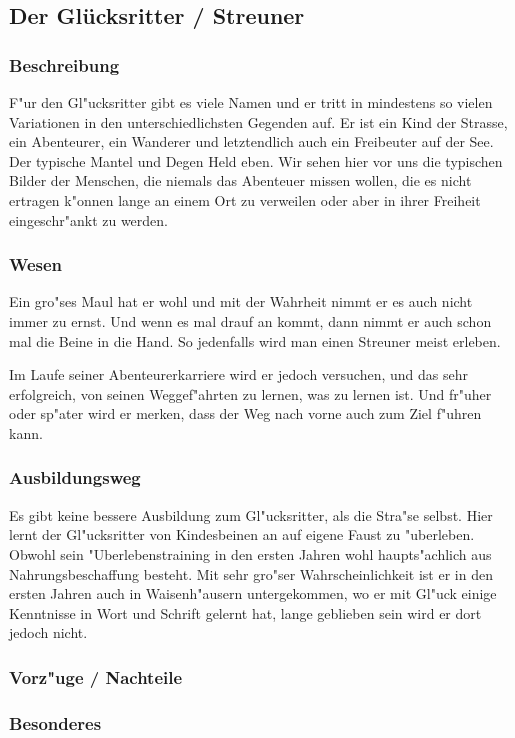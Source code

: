 \subsection{Der Glücksritter / Streuner}
\subsubsection{Beschreibung}
\par F"ur den Gl"ucksritter gibt es viele Namen und er tritt in mindestens so vielen Variationen in den 
unterschiedlichsten Gegenden auf. Er ist ein Kind der Strasse, ein Abenteurer, ein Wanderer und letztendlich 
auch ein Freibeuter auf der See. Der typische Mantel und Degen Held eben.
Wir sehen hier vor uns die typischen Bilder der Menschen, die niemals das Abenteuer missen wollen, die es nicht 
ertragen k"onnen lange an einem Ort zu verweilen oder aber in ihrer Freiheit eingeschr"ankt zu werden.
\subsubsection{Wesen}
\par Ein gro"ses Maul hat er wohl und mit der Wahrheit nimmt er es auch nicht immer zu ernst. Und wenn es mal 
drauf an kommt, dann nimmt er auch schon mal die Beine in die Hand. So jedenfalls wird man einen Streuner meist 
erleben.
\par Im Laufe seiner Abenteurerkarriere wird er jedoch versuchen, und das sehr erfolgreich, von seinen 
Weggef"ahrten zu lernen, was zu lernen ist. Und fr"uher oder sp"ater wird er merken, dass der Weg nach vorne 
auch zum Ziel f"uhren kann.
\subsubsection{Ausbildungsweg}
\par Es gibt keine bessere Ausbildung zum Gl"ucksritter, als die Stra"se selbst. Hier lernt der Gl"ucksritter 
von Kindesbeinen an auf eigene Faust zu "uberleben. Obwohl sein "Uberlebenstraining in den ersten Jahren wohl 
haupts"achlich aus Nahrungsbeschaffung besteht. Mit sehr gro"ser Wahrscheinlichkeit ist er in den ersten Jahren 
auch in Waisenh"ausern untergekommen, wo er mit Gl"uck einige Kenntnisse in Wort und Schrift gelernt hat, lange 
geblieben sein wird er dort jedoch nicht.
\subsubsection{Vorz"uge / Nachteile}
\subsubsection{Besonderes}
